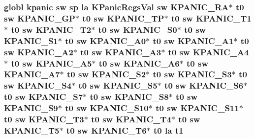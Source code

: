 \hypertarget{riscv_2kpanica_8S_adc1aa417da41ae274452333f1dd55445}{
\subsubsection[{t1}]{\setlength{\rightskip}{0pt plus 5cm}globl {\bf kpanic} {\bf sw} {\bf sp} {\bf la} {\bf K\-Panic\-Regs\-Val} {\bf sw} {\bf K\-P\-A\-N\-I\-C\-\_\-\-R\-A}$\ast$ {\bf t0} {\bf sw} {\bf K\-P\-A\-N\-I\-C\-\_\-\-G\-P}$\ast$ {\bf t0} {\bf sw} {\bf K\-P\-A\-N\-I\-C\-\_\-\-T\-P}$\ast$ {\bf t0} {\bf sw} {\bf K\-P\-A\-N\-I\-C\-\_\-\-T1}$\ast$ {\bf t0} {\bf sw} {\bf K\-P\-A\-N\-I\-C\-\_\-\-T2}$\ast$ {\bf t0} {\bf sw} {\bf K\-P\-A\-N\-I\-C\-\_\-\-S0}$\ast$ {\bf t0} {\bf sw} {\bf K\-P\-A\-N\-I\-C\-\_\-\-S1}$\ast$ {\bf t0} {\bf sw} {\bf K\-P\-A\-N\-I\-C\-\_\-\-A0}$\ast$ {\bf t0} {\bf sw} {\bf K\-P\-A\-N\-I\-C\-\_\-\-A1}$\ast$ {\bf t0} {\bf sw} {\bf K\-P\-A\-N\-I\-C\-\_\-\-A2}$\ast$ {\bf t0} {\bf sw} {\bf K\-P\-A\-N\-I\-C\-\_\-\-A3}$\ast$ {\bf t0} {\bf sw} {\bf K\-P\-A\-N\-I\-C\-\_\-\-A4}$\ast$ {\bf t0} {\bf sw} {\bf K\-P\-A\-N\-I\-C\-\_\-\-A5}$\ast$ {\bf t0} {\bf sw} {\bf K\-P\-A\-N\-I\-C\-\_\-\-A6}$\ast$ {\bf t0} {\bf sw} {\bf K\-P\-A\-N\-I\-C\-\_\-\-A7}$\ast$ {\bf t0} {\bf sw} {\bf K\-P\-A\-N\-I\-C\-\_\-\-S2}$\ast$ {\bf t0} {\bf sw} {\bf K\-P\-A\-N\-I\-C\-\_\-\-S3}$\ast$ {\bf t0} {\bf sw} {\bf K\-P\-A\-N\-I\-C\-\_\-\-S4}$\ast$ {\bf t0} {\bf sw} {\bf K\-P\-A\-N\-I\-C\-\_\-\-S5}$\ast$ {\bf t0} {\bf sw} {\bf K\-P\-A\-N\-I\-C\-\_\-\-S6}$\ast$ {\bf t0} {\bf sw} {\bf K\-P\-A\-N\-I\-C\-\_\-\-S7}$\ast$ {\bf t0} {\bf sw} {\bf K\-P\-A\-N\-I\-C\-\_\-\-S8}$\ast$ {\bf t0} {\bf sw} {\bf K\-P\-A\-N\-I\-C\-\_\-\-S9}$\ast$ {\bf t0} {\bf sw} {\bf K\-P\-A\-N\-I\-C\-\_\-\-S10}$\ast$ {\bf t0} {\bf sw} {\bf K\-P\-A\-N\-I\-C\-\_\-\-S11}$\ast$ {\bf t0} {\bf sw} {\bf K\-P\-A\-N\-I\-C\-\_\-\-T3}$\ast$ {\bf t0} {\bf sw} {\bf K\-P\-A\-N\-I\-C\-\_\-\-T4}$\ast$ {\bf t0} {\bf sw} {\bf K\-P\-A\-N\-I\-C\-\_\-\-T5}$\ast$ {\bf t0} {\bf sw} {\bf K\-P\-A\-N\-I\-C\-\_\-\-T6}$\ast$ {\bf t0} {\bf la} t1}}\label{riscv_2kpanica_8S_adc1aa417da41ae274452333f1dd55445}

